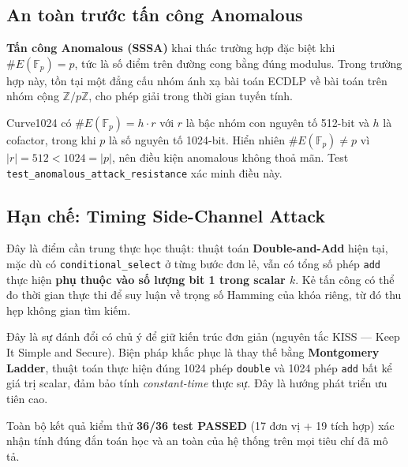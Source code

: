 \subsection{An toàn trước tấn công
Anomalous}\label{an-touxe0n-trux1b0ux1edbc-tux1ea5n-cuxf4ng-anomalous}

\textbf{Tấn công Anomalous (SSSA)} \citep{SmartAnomaly1999} khai thác
trường hợp đặc biệt khi \(\#E(\mathbb{F}_p) = p\), tức là số điểm trên
đường cong bằng đúng modulus. Trong trường hợp này, tồn tại một đẳng cấu
nhóm ánh xạ bài toán ECDLP về bài toán trên nhóm cộng
\(\mathbb{Z}/p\mathbb{Z}\), cho phép giải trong thời gian tuyến tính.

Curve1024 có \(\#E(\mathbb{F}_p) = h \cdot r\) với \(r\) là bậc nhóm con
nguyên tố 512-bit và \(h\) là cofactor, trong khi \(p\) là số nguyên tố
1024-bit. Hiển nhiên \(\#E(\mathbb{F}_p) \neq p\) vì
\(|r| = 512 < 1024 = |p|\), nên điều kiện anomalous không thoả mãn. Test
\texttt{test\_anomalous\_attack\_resistance} xác minh điều này.

\subsection{Hạn chế: Timing Side-Channel
Attack}\label{hux1ea1n-chux1ebf-timing-side-channel-attack}

Đây là điểm cần trung thực học thuật: thuật toán \textbf{Double-and-Add}
hiện tại, mặc dù có \texttt{conditional\_select} ở từng bước đơn lẻ, vẫn
có tổng số phép \texttt{add} thực hiện \textbf{phụ thuộc vào số lượng
bit 1 trong scalar \(k\)}. Kẻ tấn công có thể đo thời gian thực thi để
suy luận về trọng số Hamming của khóa riêng, từ đó thu hẹp không gian
tìm kiếm.

Đây là sự đánh đổi có chủ ý để giữ kiến trúc đơn giản (nguyên tắc KISS
--- Keep It Simple and Secure). Biện pháp khắc phục là thay thế bằng
\textbf{Montgomery Ladder}, thuật toán thực hiện đúng 1024 phép
\texttt{double} và 1024 phép \texttt{add} bất kể giá trị scalar, đảm bảo
tính \emph{constant-time} thực sự. Đây là hướng phát triển ưu tiên cao.

Toàn bộ kết quả kiểm thử \textbf{36/36 test PASSED} (17 đơn vị + 19 tích
hợp) xác nhận tính đúng đắn toán học và an toàn của hệ thống trên mọi
tiêu chí đã mô tả.

\FloatBarrier
